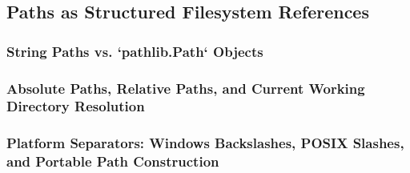 \subsection{Paths as Structured Filesystem References}
\subsubsection{String Paths vs. `pathlib.Path` Objects}
\subsubsection{Absolute Paths, Relative Paths, and Current Working Directory Resolution}
\subsubsection{Platform Separators: Windows Backslashes, POSIX Slashes, and Portable Path Construction}
